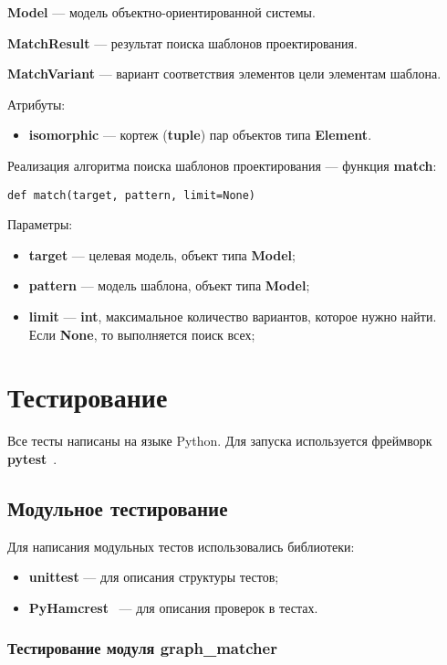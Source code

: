 \textbf{Model} --- модель объектно-ориентированной системы.

\textbf{MatchResult} --- результат поиска шаблонов проектирования.

\textbf{MatchVariant} --- вариант соответствия элементов цели элементам шаблона.

Атрибуты:
\begin{itemize}
\item \textbf{isomorphic} --- кортеж (\textbf{tuple}) пар объектов типа \textbf{Element}.
\end{itemize}

Реализация алгоритма поиска шаблонов проектирования --- функция \textbf{match}:

\begin{verbatim}
def match(target, pattern, limit=None)
\end{verbatim}

Параметры:
\begin{itemize}
\item \textbf{target} --- целевая модель, объект типа \textbf{Model};
\item \textbf{pattern} --- модель шаблона, объект типа \textbf{Model};
\item \textbf{limit} --- \textbf{int}, максимальное количество
вариантов, которое нужно найти. Если \textbf{None}, то выполняется поиск всех;
\end{itemize}

\section{Тестирование}

Все тесты написаны на языке Python.
Для запуска используется фреймворк \textbf{pytest}~\cite{pytest}.

\subsection{Модульное тестирование}

Для написания модульных тестов использовались библиотеки:
\begin{itemize}
\item \textbf{unittest} --- для описания структуры тестов;
\item \textbf{PyHamcrest}~\cite{PyHamcrest} --- для описания проверок в тестах.
\end{itemize}

\subsubsection{Тестирование модуля graph\_matcher}

